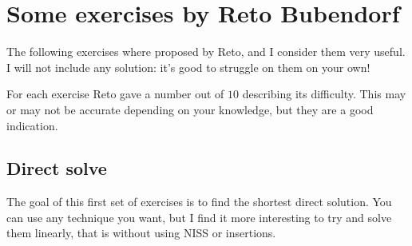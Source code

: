 \documentclass[11pt,a4paper]{book}
\newcommand{\p}{\textquotesingle}
\newcommand{\m}{\texttt}
\newcommand{\ps}{\p\,\,}
\begin{document}

\chapter{Some exercises by Reto Bubendorf}
\label{appendix:EX}

The following exercises where proposed by Reto, and I consider them very useful. I will not include any solution: it's good to struggle on them on your own!

For each exercise Reto gave a number out of $10$ describing its difficulty. This may or may not be accurate depending on your knowledge, but they are a good indication.

\section{Direct solve}

The goal of this first set of exercises is to find the shortest direct solution. You can use any technique you want, but I find it more interesting to try and solve them linearly, that is without using NISS or insertions.
\end{document}
